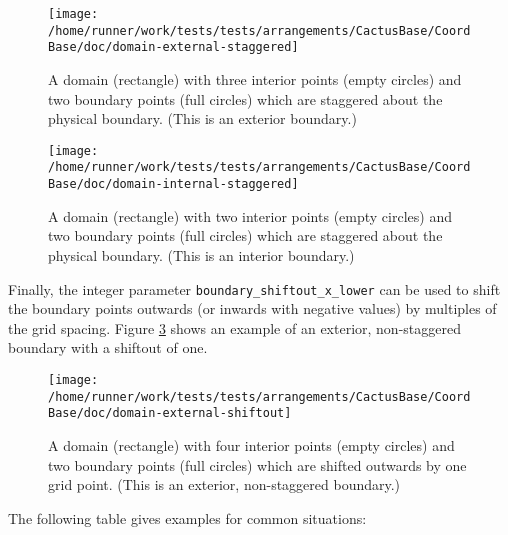 \begin{figure}
\begin{center}
\texttt{[image: /home/runner/work/tests/tests/arrangements/CactusBase/CoordBase/doc/domain-external-staggered]}
\end{center}
\caption{A domain (rectangle) with three interior points (empty circles)
and two boundary points (full circles) which are staggered about the
physical boundary.  (This is an exterior boundary.)}
\label{CactusBase:CoordBase:fig-domain-external-staggered}
\end{figure}

\begin{figure}
\begin{center}
\texttt{[image: /home/runner/work/tests/tests/arrangements/CactusBase/CoordBase/doc/domain-internal-staggered]}
\end{center}
\caption{A domain (rectangle) with two interior points (empty circles)
and two boundary points (full circles) which are staggered about the
physical boundary.  (This is an interior boundary.)}
\label{CactusBase:CoordBase:fig-domain-internal-staggered}
\end{figure}

Finally, the integer parameter {\texttt{boundary\_shiftout\_x\_lower}}
can be used to shift the boundary points outwards (or inwards with
negative values) by multiples of the grid spacing.  Figure
{\ref{CactusBase:CoordBase:fig-domain-external-shiftout}} shows an
example of an exterior, non-staggered boundary with a shiftout of one.

\begin{figure}
\begin{center}
\texttt{[image: /home/runner/work/tests/tests/arrangements/CactusBase/CoordBase/doc/domain-external-shiftout]}
\end{center}
\caption{A domain (rectangle) with four interior points (empty circles)
and two boundary points (full circles) which are shifted outwards by
one grid point.  (This is an exterior, non-staggered boundary.)}
\label{CactusBase:CoordBase:fig-domain-external-shiftout}
\end{figure}

The following table gives examples for common situations:

